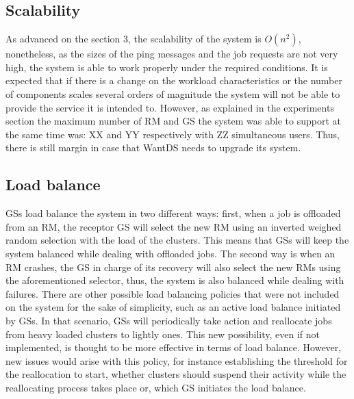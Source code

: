 \subsection{Scalability}
As advanced on the section 3, the scalability of the system is $O(n^2)$, nonetheless, as the sizes of the ping messages and the job requests are not very high, the system is able to work properly under the required conditions. It is expected that if there is a change on the workload characteristics or the number of components scales several orders of magnitude the system will not be able to provide the service it is intended to. However, as explained in the experiments section the maximum number of RM and GS the system was able to support at the same time was: XX and YY respectively with ZZ simultaneous users. Thus, there is still margin in case that WantDS needs to upgrade its system.

\subsection{Load balance}
GSs load balance the system in two different ways: first, when a job is offloaded from an RM, the receptor GS will select the new RM using an inverted weighed random selection with the load of the clusters. This means that GSs will keep the system balanced while dealing with offloaded jobs. The second way is when an RM crashes, the GS in charge of its recovery will also select the new RMs using the aforementioned selector, thus, the system is also balanced while dealing with failures. There are other possible load balancing policies that were not included on the system for the sake of simplicity, such as an active load balance initiated by GSs. In that scenario, GSs will periodically take action and reallocate jobs from heavy loaded clusters to lightly ones. This new possibility, even if not implemented, is thought to be more effective in terms of load balance. However, new issues would arise with this policy, for instance establishing the threshold for the reallocation to start, whether clusters should suspend their activity while the reallocating process takes place or, which GS initiates the load balance.


